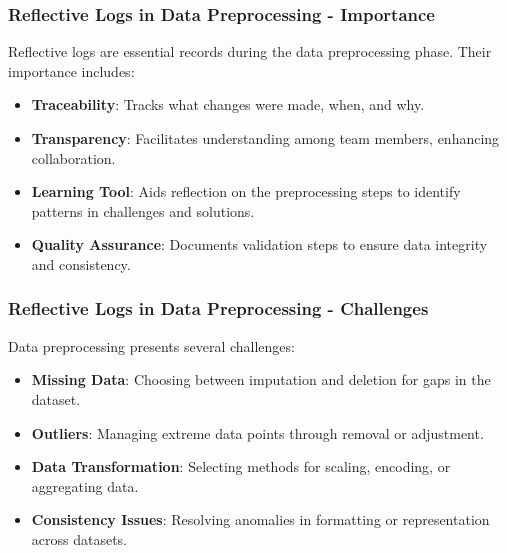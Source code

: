 \documentclass[aspectratio=169]{beamer}
\begin{document}
\begin{frame}[fragile]
    \frametitle{Reflective Logs in Data Preprocessing - Importance}
    
    Reflective logs are essential records during the data preprocessing phase. Their importance includes:
    
    \begin{itemize}
        \item \textbf{Traceability}: Tracks what changes were made, when, and why.
        \item \textbf{Transparency}: Facilitates understanding among team members, enhancing collaboration.
        \item \textbf{Learning Tool}: Aids reflection on the preprocessing steps to identify patterns in challenges and solutions.
        \item \textbf{Quality Assurance}: Documents validation steps to ensure data integrity and consistency.
    \end{itemize}
\end{frame}

\begin{frame}[fragile]
    \frametitle{Reflective Logs in Data Preprocessing - Challenges}
    
    Data preprocessing presents several challenges:
    
    \begin{itemize}
        \item \textbf{Missing Data}: Choosing between imputation and deletion for gaps in the dataset.
        \item \textbf{Outliers}: Managing extreme data points through removal or adjustment.
        \item \textbf{Data Transformation}: Selecting methods for scaling, encoding, or aggregating data.
        \item \textbf{Consistency Issues}: Resolving anomalies in formatting or representation across datasets.
    \end{itemize}
\end{frame}
\end{document}
